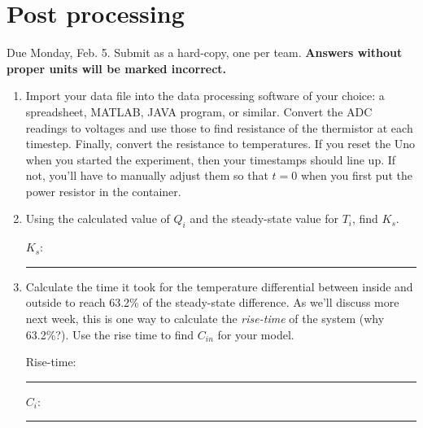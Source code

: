 \documentclass[11pt]{article} %
\begin{document}
\clearpage

\section{Post processing}
\label{sec:post}
Due Monday, Feb. 5. Submit as a hard-copy, one per team. {\bf Answers without proper units will be marked incorrect.}
\begin{enumerate}
\item Import your data file into the data processing software of your choice: a spreadsheet, MATLAB, JAVA program, or similar. Convert the ADC readings to voltages and use those to find resistance of the thermistor at each timestep. Finally, convert the resistance to temperatures. If you reset the Uno when you started the experiment, then your timestamps should line up. If not, you’ll have to manually adjust them so that $t=0$ when you first put the power resistor in the container.
\item Using the calculated value of $Q_{i}$ and the steady-state value for $T_{i}$, find $K_s$.

\vspace{0.25in}
$K_s$: \rule{2in}{0.4pt}
\vspace{0.25in}

\item Calculate the time it took for the temperature differential between inside and outside to reach 63.2\% of the steady-state difference. As we’ll discuss more next week, this is one way to calculate the \emph{rise-time} of the system (why 63.2\%?). Use the rise time to find $C_{in}$ for your model.

\vspace{0.25in}
Rise-time: \rule{2in}{0.4pt}
\vspace{0.25in}

\vspace{0.25in}
$C_i$: \rule{2in}{0.4pt}
\vspace{0.25in}



\end{enumerate}
\end{document}
